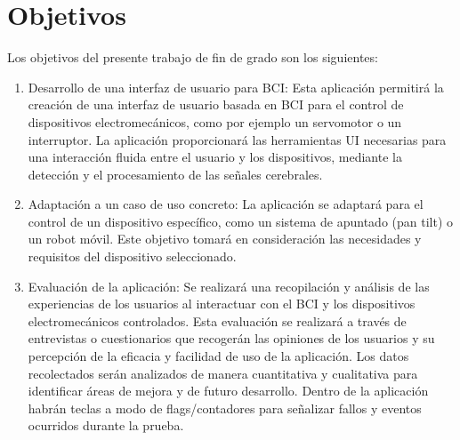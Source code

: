 \section{Objetivos}

Los objetivos del presente trabajo de fin de grado son los siguientes:

\begin{enumerate}
\item Desarrollo de una interfaz de usuario para BCI: Esta aplicación permitirá la creación de una interfaz de usuario basada en BCI para el control de dispositivos electromecánicos, como por ejemplo un servomotor o un interruptor. La aplicación proporcionará las herramientas UI necesarias para una interacción fluida entre el usuario y los dispositivos, mediante la detección y el procesamiento de las señales cerebrales.

\item Adaptación a un caso de uso concreto: La aplicación se adaptará para el control de un dispositivo específico, como un sistema de apuntado (pan tilt) o un robot móvil. Este objetivo tomará en consideración las necesidades y requisitos del dispositivo seleccionado.

\item Evaluación de la aplicación: Se realizará una recopilación y análisis de las experiencias de los usuarios al interactuar con el BCI y los dispositivos electromecánicos controlados. Esta evaluación se realizará a través de entrevistas o cuestionarios que recogerán las opiniones de los usuarios y su percepción de la eficacia y facilidad de uso de la aplicación. Los datos recolectados serán analizados de manera cuantitativa y cualitativa para identificar áreas de mejora y de futuro desarrollo. Dentro de la aplicación habrán teclas a modo de flags/contadores para señalizar fallos y eventos ocurridos durante la prueba.
\end{enumerate}